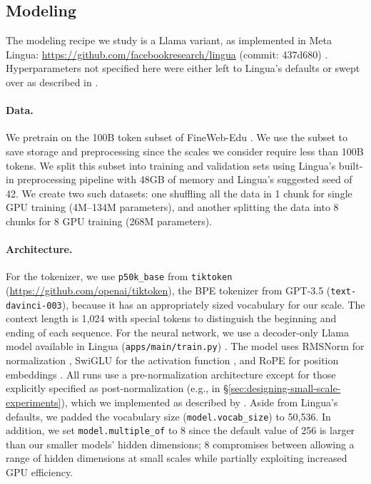 \subsection{Modeling}
\label{app:experimental-design:modeling}

The modeling recipe we study is a Llama variant, as implemented in Meta Lingua: \url{https://github.com/facebookresearch/lingua} (commit: 437d680) \citep{meta-lingua}. Hyperparameters not specified here were either left to Lingua's defaults or swept over as described in .

\paragraph{Data.} We pretrain on the 100B token subset of FineWeb-Edu \citep{Penedo2024TheFineWeb}. We use the subset to save storage and preprocessing since the scales we consider require less than 100B tokens. We split this subset into training and validation sets using Lingua's built-in preprocessing pipeline with 48GB of memory and Lingua's suggested seed of 42. We create two such datasets: one shuffling all the data in 1 chunk for single GPU training (4M--134M parameters), and another splitting the data into 8 chunks for 8 GPU training (268M parameters).

\paragraph{Architecture.} For the tokenizer, we use \texttt{p50k\_base} from \texttt{tiktoken} (\url{https://github.com/openai/tiktoken}), the BPE tokenizer from GPT-3.5 (\texttt{text-davinci-003}), because it has an appropriately sized vocabulary for our scale. The context length is 1{,}024 with special tokens to distinguish the beginning and ending of each sequence. For the neural network, we use a decoder-only Llama model \citep{grattafiori2024llama3herdmodels} available in Lingua (\texttt{apps/main/train.py}) \citep{meta-lingua}. The model uses RMSNorm for normalization \citep{Zhang2019Root}, SwiGLU for the activation function \citep{shazeer2020gluvariantsimprovetransformer}, and RoPE for position embeddings \citep{Su2024RoFormer}. All runs use a pre-normalization architecture except for those explicitly specified as post-normalization (e.g., in \S\ref{sec:designing-small-scale-experiments}), which we implemented as described by \citet{Xiong2020OnLayer}. Aside from Lingua's defaults, we padded the vocabulary size (\texttt{model.vocab\_size}) to 50{,}536. In addition, we set \texttt{model.multiple\_of} to 8 since the default value of 256 is larger than our smaller models' hidden dimensions; 8 compromises between allowing a range of hidden dimensions at small scales while partially exploiting increased GPU efficiency.

